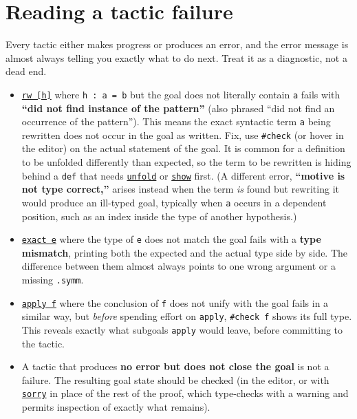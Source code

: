 \section{Reading a tactic failure}\label{sec:05-tactics:03-reading-failures:1}

Every tactic either makes progress or produces an error, and the error message is almost always telling you exactly what to do next. Treat it as a diagnostic, not a dead end.

\begin{itemize}
\tightlist
\item
  \href{https://lean-lang.org/doc/reference/latest/Tactic-Proofs/Tactic-Reference/}{\texttt{rw [h]}} where \texttt{h : a = b} but the goal does not literally contain \texttt{a} fails with \textbf{``did not find instance of the pattern''} (also phrased ``did not find an occurrence of the pattern''). This means the exact syntactic term \texttt{a} being rewritten does not occur in the goal as written. Fix, use \texttt{\#check} (or hover in the editor) on the actual statement of the goal. It is common for a definition to be unfolded differently than expected, so the term to be rewritten is hiding behind a \texttt{def} that needs \href{https://lean-lang.org/doc/reference/latest/Tactic-Proofs/Tactic-Reference/}{\texttt{unfold}} or \href{https://lean-lang.org/doc/reference/latest/Tactic-Proofs/Tactic-Reference/}{\texttt{show}} first. (A different error, \textbf{``motive is not type correct,''} arises instead when the term \emph{is} found but rewriting it would produce an ill-typed goal, typically when \texttt{a} occurs in a dependent position, such as an index inside the type of another hypothesis.)
\item
  \href{https://lean-lang.org/doc/reference/latest/Tactic-Proofs/Tactic-Reference/}{\texttt{exact e}} where the type of \texttt{e} does not match the goal fails with a \textbf{type mismatch}, printing both the expected and the actual type side by side. The difference between them almost always points to one wrong argument or a missing \texttt{.symm}.
\item
  \href{https://lean-lang.org/doc/reference/latest/Tactic-Proofs/Tactic-Reference/}{\texttt{apply f}} where the conclusion of \texttt{f} does not unify with the goal fails in a similar way, but \emph{before} spending effort on \texttt{apply}, \texttt{\#check f} shows its full type. This reveals exactly what subgoals \texttt{apply} would leave, before committing to the tactic.
\item
  A tactic that produces \textbf{no error but does not close the goal} is not a failure. The resulting goal state should be checked (in the editor, or with \href{https://lean-lang.org/doc/reference/latest/Tactic-Proofs/Tactic-Reference/}{\texttt{sorry}} in place of the rest of the proof, which type-checks with a warning and permits inspection of exactly what remains).
\end{itemize}

